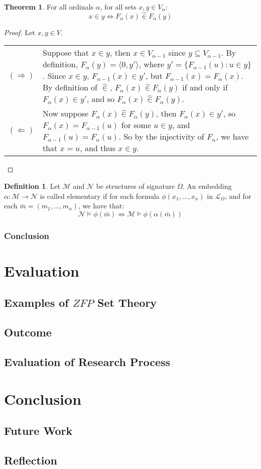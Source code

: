 \documentclass[11pt]{report}
\newcommand{\pair}[2]{\langle #1,#2 \rangle}
\newcommand{\zin}{\mathrel{\widehat{\in}}}
\theoremstyle{definition}
\theoremstyle{theorem}
\theoremstyle{lemma}
\newtheorem{definition}{Definition}[section]
\newtheorem{theorem}{Theorem}[section]
\begin{document}
\begin{theorem} For all ordinals $\alpha$, for all sets $x,y\in V_{\alpha}$:
  $$x\in y \Leftrightarrow F_\alpha(x) \zin F_\alpha(y)$$
\begin{proof} Let $x,y\in V$. \hspace{1mm} \\

  \begin{tabular}{p{7mm} p{144mm}}
    $(\Rightarrow)$ \rule{0pt}{10ex} &
    Suppose that $x\in y$, then $x\in V_{\alpha-1}$ since $y\subseteq V_{\alpha-1}$.
    By definition, $F_\alpha(y) = \pair{0}{y'}$, where $y' = \{F_{\alpha-1}(u) : u\in y\}$.
    Since $x\in y$, $F_{\alpha-1}(x)\in y'$, but $F_{\alpha-1}(x)=F_\alpha(x)$.
    By definition of $\zin$, $F_{\alpha}(x)\zin F_\alpha(y)$ if and only if $F_\alpha(x) \in y'$, and so $F_\alpha(x) \zin F_\alpha(y)$.
    \\

    $(\Leftarrow)$ &
    Now suppose $F_\alpha(x) \zin F_\alpha(y)$, then $F_\alpha(x) \in y'$, so $F_\alpha(x) = F_{\alpha-1}(u)$ for some $u\in y$, and $F_{\alpha-1}(u) = F_{\alpha}(u)$.
    So by the injectivity of $F_\alpha$, we have that $x=u$, and thus $x\in y$.
  \end{tabular}
\end{proof}
\end{theorem}

\begin{definition} Let $\mathcal{M}$ and $\mathcal{N}$ be structures of signature $\Omega$.
An embedding $\alpha: \mathcal{M} \to \mathcal{N}$ is called elementary if for each formula $\phi(x_1,\ldots,x_n)$ in $\mathcal{L}_\Omega$, and for each $\bar{m} = (m_1,\ldots,m_n)$, we have that:
$$\mathcal N \vDash \phi(\bar m) \Leftrightarrow \mathcal M \vDash \phi(\alpha(\bar m))$$
\end{definition}
\subsection{Conclusion}

\chapter{Evaluation}
\section{Examples of $\mathit{ZFP}$ Set Theory}\label{zfpexamples}
\section{Outcome}
\section{Evaluation of Research Process}

\chapter{Conclusion}
\section{Future Work}
\section{Reflection}




\end{document}
